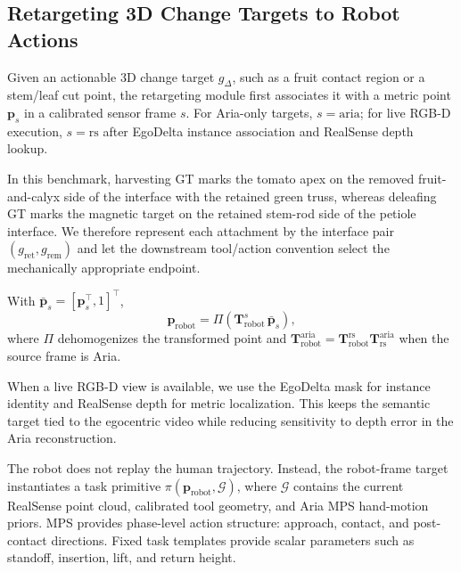 

\subsection{Retargeting 3D Change Targets to Robot Actions}
\label{subsec:retargeting}

Given an actionable 3D change target $g_{\Delta}$, such as a fruit
contact region or a stem/leaf cut point, the retargeting module first
associates it with a metric point $\mathbf{p}_s$ in a calibrated
sensor frame $s$.  For Aria-only targets, $s=\mathrm{aria}$; for live
RGB-D execution, $s=\mathrm{rs}$ after EgoDelta instance association
and RealSense depth lookup.

In this benchmark, harvesting GT marks the tomato apex on the removed
fruit-and-calyx side of the interface with the retained green truss,
whereas deleafing GT marks the magnetic target on the retained stem-rod
side of the petiole interface.
We therefore represent each attachment by the interface pair
$(g_{\mathrm{ret}},g_{\mathrm{rem}})$ and let the downstream tool/action
convention select the mechanically appropriate endpoint.

With $\bar{\mathbf{p}}_s=[\mathbf{p}_s^{\top},1]^{\top}$,
%
\begin{equation}
  \mathbf{p}_{\mathrm{robot}}
  = \Pi\!\left(
      \mathbf{T}_{\mathrm{robot}}^{s}\,
      \bar{\mathbf{p}}_s
    \right),
  \label{eq:target_transform}
\end{equation}
%
where $\Pi$ dehomogenizes the transformed point and
$\mathbf{T}_{\mathrm{robot}}^{\mathrm{aria}} =
\mathbf{T}_{\mathrm{robot}}^{\mathrm{rs}}
\mathbf{T}_{\mathrm{rs}}^{\mathrm{aria}}$ when the source frame is
Aria.

When a live RGB-D view is available, we use the EgoDelta mask for
instance identity and RealSense depth for metric localization.  This
keeps the semantic target tied to the egocentric video while
reducing sensitivity to depth error in the Aria reconstruction.

The robot does not replay the human trajectory.  Instead, the
robot-frame target instantiates a task primitive
$\pi(\mathbf{p}_{\mathrm{robot}}, \mathcal{G})$, where
$\mathcal{G}$ contains the current RealSense point cloud, calibrated
tool geometry, and Aria MPS hand-motion priors.  MPS provides
phase-level action structure: approach, contact, and post-contact
directions.  Fixed task templates provide scalar parameters such as
standoff, insertion, lift, and return height.

